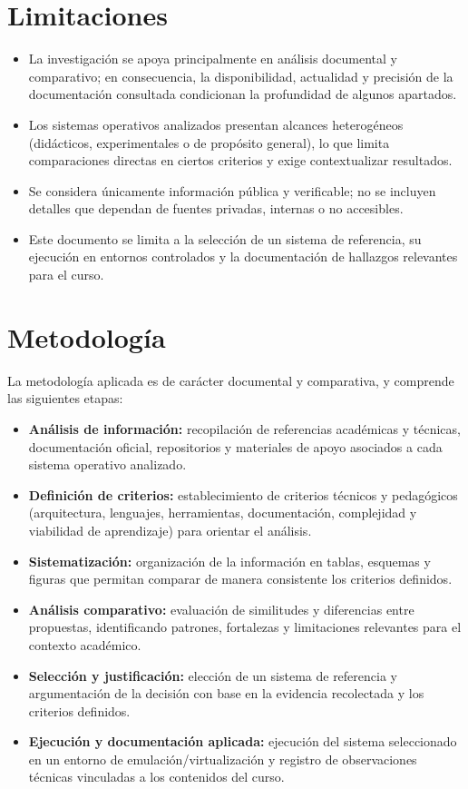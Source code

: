 \section{Limitaciones}
\begin{itemize}
    \item La investigación se apoya principalmente en análisis documental y comparativo; en consecuencia, la disponibilidad, actualidad y precisión de la documentación consultada condicionan la profundidad de algunos apartados.
    \item Los sistemas operativos analizados presentan alcances heterogéneos (didácticos, experimentales o de propósito general), lo que limita comparaciones directas en ciertos criterios y exige contextualizar resultados.
    \item Se considera únicamente información pública y verificable; no se incluyen detalles que dependan de fuentes privadas, internas o no accesibles.
    \item Este documento se limita a la selección de un sistema de referencia, su ejecución en entornos controlados y la documentación de hallazgos relevantes para el curso.
\end{itemize}

\section{Metodología}
La metodología aplicada es de carácter documental y comparativa, y comprende las siguientes etapas:
\begin{itemize}
    \item \textbf{An\'alisis de información:} recopilación de referencias académicas y técnicas, documentación oficial, repositorios y materiales de apoyo asociados a cada sistema operativo analizado.
    \item \textbf{Definición de criterios:} establecimiento de criterios técnicos y pedagógicos (arquitectura, lenguajes, herramientas, documentación, complejidad y viabilidad de aprendizaje) para orientar el análisis.
    \item \textbf{Sistematización:} organización de la información en tablas, esquemas y figuras que permitan comparar de manera consistente los criterios definidos.
    \item \textbf{Análisis comparativo:} evaluación de similitudes y diferencias entre propuestas, identificando patrones, fortalezas y limitaciones relevantes para el contexto académico.
    \item \textbf{Selección y justificación:} elección de un sistema de referencia y argumentación de la decisión con base en la evidencia recolectada y los criterios definidos.
    \item \textbf{Ejecución y documentación aplicada:} ejecución del sistema seleccionado en un entorno de emulación/virtualización y registro de observaciones técnicas vinculadas a los contenidos del curso.
\end{itemize}